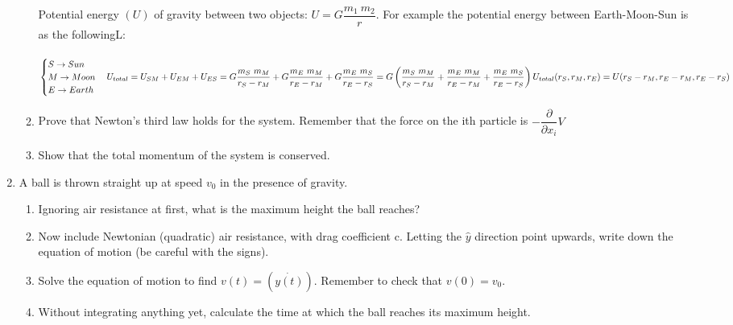 \documentclass[fleqn]{article}
\begin{document}
\begin{enumerate}
\begin{enumerate}
      \textcolor{hwColor}{
        Potential energy $(U)$ of gravity between two objects: $U=G\dfrac{m_1 ~ m_2}{r}$. For example 
        the potential energy between Earth-Moon-Sun is as the followingL: \\
        \\
        $
          \begin{cases}
            S \rightarrow Sun \\
            M \rightarrow Moon \\
            E \rightarrow Earth \\
          \end{cases} \\
          \\
          U_{total}=U_{SM}+U_{EM}+U_{ES} \\
          \\
          =G\dfrac{m_S ~ m_M}{r_S-r_M}+G\dfrac{m_E ~ m_M}{r_E-r_M}+G\dfrac{m_E ~ m_S}{r_E-r_S}=G\left(\dfrac{m_S ~ m_M}{r_S-r_M}+\dfrac{m_E ~ m_M}{r_E-r_M}+\dfrac{m_E ~ m_S}{r_E-r_S}\right) \\
          \\
          U_{total}(r_S, r_M, r_E)=U(r_S-r_M, r_E-r_M, r_E-r_S)
        $
      }

      \item Prove that Newton’s third law holds for the system. Remember
      that the force on the ith particle is $-\dfrac{\partial }{\partial x_i}V$

      \item Show that the total momentum of the system is conserved.
    \end{enumerate}

    \item A ball is thrown straight up at speed $v_0$ in the presence of gravity.
    \begin{enumerate}
      \item Ignoring air resistance at first, what is the maximum height the
      ball reaches?
      \item Now include Newtonian (quadratic) air resistance, with drag coefficient c. Letting the $\hat{y}$ direction point upwards, write down the
      equation of motion (be careful with the signs).

      \item Solve the equation of motion to find $v(t)=(\dot{y(t)})$. Remember to check that $v(0) = v_0$.

      \item Without integrating anything yet, calculate the time at which the ball reaches its maximum height.


\end{enumerate}
\end{enumerate}
\end{document}
